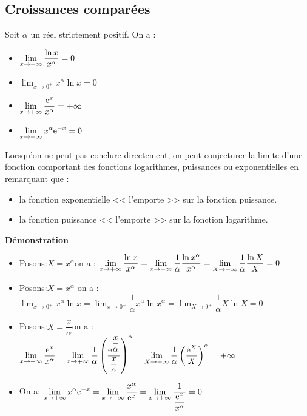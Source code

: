 \subsection{Croissances comparées}
\begin{property}
Soit $\alpha $ un réel    strictement positif.  On a :  
\begin{itemize}
\item  $ \displaystyle\lim_{x \to +\infty} \frac{\ln x}{x^{\alpha}}=0$ 

\item  $ \lim_{x \to 0^{+}} x^{\alpha}\ln x=0$

 \item  $\displaystyle \lim_{x \to +\infty} \frac{\mathrm{e}^{x}}{x^{\alpha}}=+\infty$
 
 \item  $\displaystyle \lim_{x \to +\infty} x^{\alpha}\mathrm{e}^{-x}=0$ 
\end{itemize}
\end{property}
\begin{remark}
Lorsqu'on ne peut pas conclure directement, on peut conjecturer la limite d'une fonction comportant des  fonctions logarithmes, puissances ou exponentielles en remarquant que :
\begin{itemize}
\item la fonction exponentielle <<  l'emporte >> sur la fonction puissance.
\item la fonction puissance <<  l'emporte >> sur la fonction logarithme.
\end{itemize}
\end{remark}


\textbf{Démonstration}
\begin{itemize}
\item Posons:\;$ X=x^{\alpha} $\quad on a :\;    $ \displaystyle\lim_{x \to +\infty} \dfrac{\ln x}{x^{\alpha}}  =\displaystyle \lim_{x \to +\infty} \dfrac{1}{\alpha}\dfrac{\ln x^{\alpha}}{x^{\alpha}} =\displaystyle\lim_{X \to +\infty}\dfrac{1}{\alpha} \dfrac{\ln X}{X}=0$

\item Posons:\;$ X=x^{\alpha} $ on a :
\;$ \displaystyle\lim_{x \to 0^{+}} x^{\alpha}\ln x=\displaystyle\lim_{x \to 0^{+}}\dfrac{1}{\alpha} x^{\alpha}\ln x^{\alpha} =\displaystyle\lim_{X \to 0^{+}} \dfrac{1}{\alpha}X\ln X=0$ 
\item  Posons:\;$ X=\dfrac{x}{\alpha} $\quad on a :                                   \; $ \displaystyle\lim_{x \to +\infty} \dfrac{\mathrm{e}^{x}}{x^{\alpha}}= \displaystyle \lim_{x \to +\infty} \dfrac{1}{\alpha}\left(\dfrac{\mathrm{e}^{\dfrac{x}{\alpha}}}{\dfrac{x}{\alpha}}\right)^{\alpha} =\lim_{X\to +\infty} \dfrac{1}{\alpha}\left(\dfrac{\mathrm{e}^{X}}{X}\right)^{\alpha}= +\infty$
\item On a:\; $ \displaystyle\lim_{x \to +\infty} x^{\alpha}\mathrm{e}^{-x}=\displaystyle\lim_{x \to +\infty}\dfrac{x^{\alpha}}{\mathrm{e}^{x}} =\displaystyle\lim_{x \to +\infty}\dfrac{1}{\dfrac{\mathrm{e}^{x}}{x^{\alpha}}}= 0$

\end{itemize}


